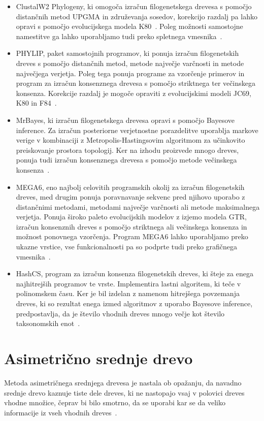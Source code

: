 \documentclass[a4paper, 12pt]{book}
\begin{document}
\begin{itemize}
	\item ClustalW2 Phylogeny, ki omogoča izračun filogenetskega drevesa s 
		 pomočjo distančnih metod UPGMA in združevanja sosedov, korekcijo 
		 razdalj pa lahko opravi s pomočjo evolucijskega modela K80~\cite{clustalw2}. 
	      Poleg možnosti samostojne namestitve ga lahko uporabljamo tudi 
	      preko spletnega vmesnika~\cite{clustalw2_phylogeny}.
	\item PHYLIP, paket samostojnih programov, ki ponuja izračun filogenetskih dreves 
		  s pomočjo distančnih metod, metode največje varčnosti in metode največjega 
		  verjetja. Poleg tega ponuja programe za vzorčenje primerov in program
	      za izračun konsenznega drevesa s pomočjo striktnega ter večinskega konsenza. 
	      Korekcije razdalj je mogoče opraviti z evolucijskimi modeli JC69, K80 in F84~\cite{phylip}.
	\item MrBayes, ki izračun filogenetskega drevesa opravi s pomočjo Bayesove inference. 
		  Za izračun posteriorne verjetnostne porazdelitve uporablja markove verige v 
		  kombinaciji z Metropolis-Hastingsovim algoritmom za učinkovito preiskovanje 
	      prostora topologij. Ker na izhodu proizvede mnogo dreves, ponuja tudi 
	      izračun konsenznega drevesa s pomočjo metode večinskega konsenza~\cite{mrbayes}.
	\item MEGA6, eno najbolj celovitih programskih okolij za izračun filogenetskih 
		  dreves, med drugim ponuja poravnavanje sekvenc pred njihovo uporabo z 
		  distančnimi metodami, metodami največje varčnosti ali metode maksimalnega
	       verjetja. Ponuja široko paleto evolucijskih modelov z izjemo modela GTR, 
	       izračun konsenznih dreves s pomočjo striktnega ali večinskega konsenza 
	       in možnost ponovnega vzorčenja. Program MEGA6 lahko uporabljamo preko ukazne
	       vrstice, vse funkcionalnosti pa so podprte tudi preko grafičnega vmesnika~\cite{mega6}. 
	\item HashCS, program za izračun konsenza filogenetskih dreves, ki šteje za 
		  enega najhitrejših programov te vrste. Implementira lastni algoritem, ki 
		  teče v polinomskem času. Ker je bil izdelan z namenom hitrejšega povzemanja 
		  dreves, ki so rezultat enega izmed algoritmov z uporabo Bayesove inference, 
		  predpostavlja, da je število vhodnih dreves mnogo večje kot število 
		  taksonomskih enot~\cite{hashcs}.
\end{itemize} 

\chapter{Asimetrično srednje drevo}
Metoda asimetričnega srednjega drevesa je nastala ob opažanju, da navadno srednje 
drevo kaznuje tiste dele dreves, ki ne nastopajo vsaj v polovici dreves vhodne množice, 
čeprav bi bilo smotrno, da se uporabi kar se da veliko informacije iz vseh vhodnih 
dreves~\cite{pw}.
\end{document}
